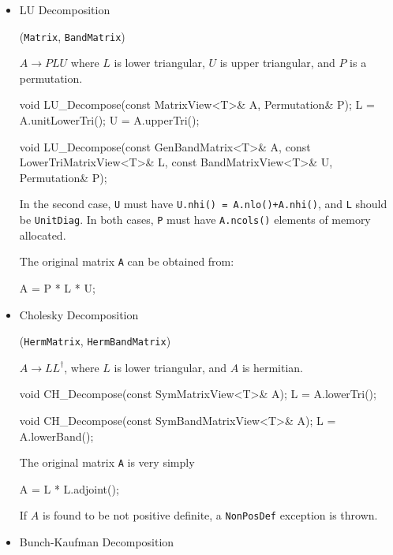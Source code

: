 \documentclass[twoside,letterpaper,11pt]{article}
\renewcommand{\tt}[1]{{\lstinline {#1}}}
\begin{document}
\begin{itemize}

\item LU Decomposition 

(\tt{Matrix}, \tt{BandMatrix})

$A \rightarrow P L U$ where $L$ is lower triangular, 
$U$ is upper triangular, and $P$ is a permutation.

\begin{tmvcode}
void LU_Decompose(const MatrixView<T>& A, Permutation& P);
L = A.unitLowerTri();
U = A.upperTri();

void LU_Decompose(const GenBandMatrix<T>& A, 
      const LowerTriMatrixView<T>& L, 
      const BandMatrixView<T>& U, Permutation& P);
\end{tmvcode}
In the second case, \tt{U} must have \tt{U.nhi() = A.nlo()+A.nhi()},
and \tt{L} should be \tt{UnitDiag}.
In both cases, \tt{P} must have \tt{A.ncols()} elements of memory allocated.

The original matrix \tt{A} can be obtained from:
\begin{tmvcode}
A = P * L * U;
\end{tmvcode}

\item Cholesky Decomposition 

(\tt{HermMatrix}, \tt{HermBandMatrix})

$A \rightarrow L L^\dagger$, where $L$ is lower triangular,
and $A$ is hermitian.

\begin{tmvcode}
void CH_Decompose(const SymMatrixView<T>& A);
L = A.lowerTri();

void CH_Decompose(const SymBandMatrixView<T>& A);
L = A.lowerBand();
\end{tmvcode}

The original matrix \tt{A} is very simply
\begin{tmvcode}
A = L * L.adjoint();
\end{tmvcode}

If $A$ is found to be not positive definite, a \tt{NonPosDef} exception is thrown.

\item Bunch-Kaufman Decomposition 


\end{itemize}
\end{document}
